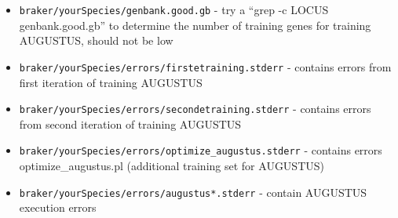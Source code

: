 \documentclass[a4paper,10pt]{report}
\begin{document}
\begin{itemize}
 \item  \texttt{braker/yourSpecies/genbank.good.gb} - try a ``grep -c LOCUS genbank.good.gb'' to determine the 
                                        number of training genes for training AUGUSTUS, should not
                                        be low

 \item  \texttt{braker/yourSpecies/errors/firstetraining.stderr} - contains errors from first iteration of 
                                                     training AUGUSTUS
 \item  \texttt{braker/yourSpecies/errors/secondetraining.stderr} - contains errors from second iteration of
                                                      training AUGUSTUS
   \item \texttt{braker/yourSpecies/errors/optimize\_augustus.stderr} - contains errors optimize\_augustus.pl 
                                                        (additional training set for AUGUSTUS)

 \item  \texttt{braker/yourSpecies/errors/augustus*.stderr} - contain AUGUSTUS execution errors

\end{itemize}




\end{document}

